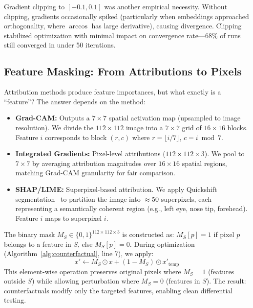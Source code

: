 Gradient clipping to $[-0.1, 0.1]$ was another empirical necessity. Without clipping, gradients occasionally spiked (particularly when embeddings approached orthogonality, where $\arccos$ has large derivative), causing divergence. Clipping stabilized optimization with minimal impact on convergence rate—68\% of runs still converged in under 50 iterations.

\subsection{Feature Masking: From Attributions to Pixels}

Attribution methods produce feature importances, but what exactly is a ``feature''? The answer depends on the method:

\begin{itemize}
\item \textbf{Grad-CAM:} Outputs a $7 \times 7$ spatial activation map (upsampled to image resolution). We divide the $112 \times 112$ image into a $7 \times 7$ grid of $16 \times 16$ blocks. Feature $i$ corresponds to block $(r, c)$ where $r = \lfloor i / 7 \rfloor$, $c = i \bmod 7$.

\item \textbf{Integrated Gradients:} Pixel-level attributions ($112 \times 112 \times 3$). We pool to $7 \times 7$ by averaging attribution magnitudes over $16 \times 16$ spatial regions, matching Grad-CAM granularity for fair comparison.

\item \textbf{SHAP/LIME:} Superpixel-based attribution. We apply Quickshift segmentation~\citep{vedaldi2008quick} to partition the image into $\approx 50$ superpixels, each representing a semantically coherent region (e.g., left eye, nose tip, forehead). Feature $i$ maps to superpixel $i$.
\end{itemize}

The binary mask $M_S \in \{0, 1\}^{112 \times 112 \times 3}$ is constructed as: $M_S[p] = 1$ if pixel $p$ belongs to a feature in $S$, else $M_S[p] = 0$. During optimization (Algorithm~\ref{alg:counterfactual}, line 7), we apply:
\begin{equation}
x' \leftarrow M_S \odot x + (1 - M_S) \odot x'_{\text{temp}}
\end{equation}
This element-wise operation preserves original pixels where $M_S = 1$ (features outside $S$) while allowing perturbation where $M_S = 0$ (features in $S$). The result: counterfactuals modify only the targeted features, enabling clean differential testing.

